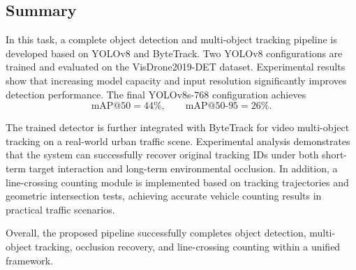\subsection{Summary}

In this task, a complete object detection and multi-object tracking pipeline is developed based on YOLOv8 and ByteTrack. Two YOLOv8 configurations are trained and evaluated on the VisDrone2019-DET dataset. Experimental results show that increasing model capacity and input resolution significantly improves detection performance. The final YOLOv8s-$768$ configuration achieves
\[
\mathrm{mAP@50}=44\%, \qquad
\mathrm{mAP@50\text{-}95}=26\%.
\]

The trained detector is further integrated with ByteTrack for video multi-object tracking on a real-world urban traffic scene. Experimental analysis demonstrates that the system can successfully recover original tracking IDs under both short-term target interaction and long-term environmental occlusion. In addition, a line-crossing counting module is implemented based on tracking trajectories and geometric intersection tests, achieving accurate vehicle counting results in practical traffic scenarios.

Overall, the proposed pipeline successfully completes object detection, multi-object tracking, occlusion recovery, and line-crossing counting within a unified framework.
